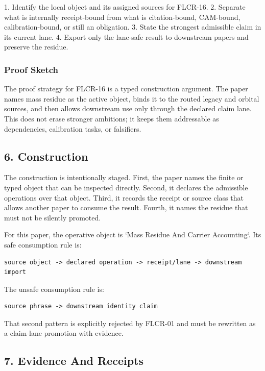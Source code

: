 \documentclass[11pt]{article}
\begin{document}
1. Identify the local object and its assigned sources for FLCR-16.
2. Separate what is internally receipt-bound from what is citation-bound, CAM-bound, calibration-bound, or still an obligation.
3. State the strongest admissible claim in its current lane.
4. Export only the lane-safe result to downstream papers and preserve the residue.

\subsubsection*{Proof Sketch}

The proof strategy for FLCR-16 is a typed construction argument. The paper names mass residue as the active object, binds it to the routed legacy and orbital sources, and then allows downstream use only through the declared claim lane. This does not erase stronger ambitions; it keeps them addressable as dependencies, calibration tasks, or falsifiers.

\subsection*{6. Construction}

The construction is intentionally staged. First, the paper names the finite or
typed object that can be inspected directly. Second, it declares the admissible
operations over that object. Third, it records the receipt or source class that
allows another paper to consume the result. Fourth, it names the residue that
must not be silently promoted.

For this paper, the operative object is `Mass Residue And Carrier Accounting`. Its safe consumption
rule is:

\begin{verbatim}
source object -> declared operation -> receipt/lane -> downstream import
\end{verbatim}

The unsafe consumption rule is:

\begin{verbatim}
source phrase -> downstream identity claim
\end{verbatim}

That second pattern is explicitly rejected by FLCR-01 and must be rewritten as
a claim-lane promotion with evidence.

\subsection*{7. Evidence And Receipts}
\end{document}
